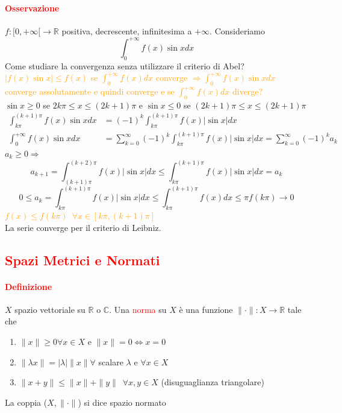 \documentclass{article}
\newcommand{\R}{\mathbb{R}}
\newcommand{\C}{\mathbb{C}}
\begin{document}
\paragraph{\textcolor{red}{Osservazione}}
$f:[0,+\infty[\rightarrow\R$ positiva, decrescente, infinitesima a $+\infty$. Consideriamo
\begin{equation*}
    \int_{0}^{+\infty} f(x)\sin xdx
\end{equation*}
Come studiare la convergenza senza utilizzare il criterio di Abel?\\
\textcolor{orange}{$|f(x)\sin x|\leq f(x)$ se $\int_{0}^{+\infty}f(x)dx$ converge $\Rightarrow \int_{0}^{+\infty}f(x)\sin x dx$ converge assolutamente e quindi converge e se $\int_{0}^{+\infty}f(x)dx$ diverge?}\\
$\sin x \geq 0$ se $ 2k\pi \leq x \leq (2k+1)\pi$ e $\sin x \leq 0$ se $(2k+1)\pi \leq x \leq (2k+1)\pi$
\begin{align*}
    \int_{k\pi}^{(k+1)\pi}f(x)\sin x dx &= (-1)^k\int_{k\pi}^{(k+1)\pi}f(x)|\sin x|dx\\
     \int_{0}^{+\infty}f(x)\sin x dx &=\sum_{k=0}^{\infty} (-1)^k \int_{k\pi}^{(k+1)\pi}f(x)|\sin x|dx=\sum_{k=0}^{\infty} (-1)^k a_k
\end{align*}
$a_k \geq 0 \Rightarrow$
\begin{equation*}
    a_{k+1}= \int_{(k+1)\pi}^{(k+2)\pi}f(x)|\sin x|dx \leq \int_{k\pi}^{(k+1)\pi}f(x)|\sin x|dx=a_k
\end{equation*}
\begin{equation*}
    0\leq a_k = \int_{k\pi}^{(k+1)\pi}f(x)|\sin x|dx \leq \int_{k\pi}^{(k+1)\pi}f(x)dx\leq \pi f(k\pi)\rightarrow 0
\end{equation*}
\textcolor{orange}{$f(x)\leq f(k\pi) \,\,\, \forall x\in [k\pi,(k+1)\pi]$}\\
La serie converge per il criterio di Leibniz.

\subsection{\textcolor{red}{Spazi Metrici e Normati}}
\paragraph{\textcolor{red}{Definizione}}
$X$ spazio vettoriale su $\R$ o $\C$. Una \textcolor{red}{norma} su $X$ è una funzione $\parallel \cdot \parallel : X\rightarrow \R$ tale che 
\begin{enumerate}
    \item $\parallel x\parallel\geq 0 \forall x \in X$ e $\parallel x\parallel=0 \Leftrightarrow x=0$
    \item $\parallel \lambda x\parallel=|\lambda|\parallel x\parallel \forall$ scalare $\lambda$ e $\forall x \in X$
    \item $\parallel x+y \parallel \leq \parallel x\parallel + \parallel y \parallel \,\,\, \forall x,y \in X$ (disuguaglianza triangolare)
\end{enumerate}
La coppia ($X,\parallel\cdot\parallel$) si dice spazio normato
\end{document}
